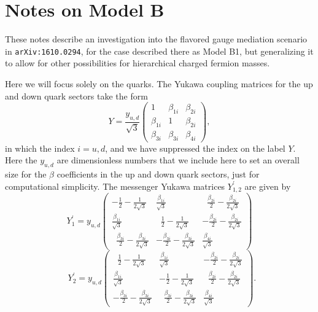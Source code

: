 \documentclass[12pt]{article}
\begin{document}
\section*{Notes on Model B}

These notes describe an investigation into the flavored gauge mediation scenario in {\tt arXiv:1610.0294}, for the case described there as Model B1, but generalizing it to allow for other possibilities for hierarchical charged fermion masses. 

Here we will focus solely on the quarks.  The Yukawa coupling matrices for the up and down quark sectors take the form
\begin{equation}
Y =  \frac{y_{u,d}}{\sqrt{3}} \left (\begin{array}{ccc} 1 & \beta_{1i} & \beta_{2i} \\ \beta_{1i} & 1 & \beta_{2i} \\ \beta_{3i} & \beta_{3i} & \beta_{4i}           \end{array} \right ),
\label{eq:yud}
\end{equation}
in which the index $i=u,d$, and we have suppressed the index on the label $Y$. Here the $y_{u,d}$ are dimensionless numbers that we include here to set an overall size for the $\beta$ coefficients in the up and down quark sectors, just for computational simplicity.  The messenger Yukawa matrices $Y^\prime_{1,2}$ are given by
\begin{equation}
Y^\prime_1=y_{u,d} \left (\begin{array}{ccc} -\frac{1}{2}-\frac{1}{2\sqrt{3}} & \frac{\beta_{1i}}{\sqrt{3}} & \;\; \frac{\beta_{2i}}{2} - \frac{\beta_{2i}}{2\sqrt{3}} \\  \frac{\beta_{1i}}{\sqrt{3}} & \;\; \frac{1}{2}-\frac{1}{2\sqrt{3}} & -\frac{\beta_{2i}}{2} - \frac{\beta_{2i}}{2\sqrt{3}} \\ \;\; \frac{\beta_{3i}}{2} - \frac{\beta_{3i}}{2\sqrt{3}} & -\frac{\beta_{3i}}{2} - \frac{\beta_{3i}}{2\sqrt{3}} & \frac{\beta_{4i}
}{\sqrt{3}}
\end{array} \right )
\end{equation}
\begin{equation}
\;\; Y^\prime_2=y_{u,d} \left (\begin{array}{ccc} \;\; \frac{1}{2}-\frac{1}{2\sqrt{3}} & \frac{\beta_{1i}}{\sqrt{3}} &  -\frac{\beta_{2i}}{2} - \frac{\beta_{2i}}{2\sqrt{3}} \\  \frac{\beta_{1i}}{\sqrt{3}} & -\frac{1}{2}-\frac{1}{2\sqrt{3}} & \;\; \frac{\beta_{2i}}{2} - \frac{\beta_{2i}}{2\sqrt{3}} \\ -\frac{\beta_{3i}}{2} - \frac{\beta_{3i}}{2\sqrt{3}} & \;\; \frac{\beta_{3i}}{2} - \frac{\beta_{3i}}{2\sqrt{3}} & \frac{\beta_{4i}
}{\sqrt{3}}
\end{array} \right ).
\end{equation}
\end{document}

